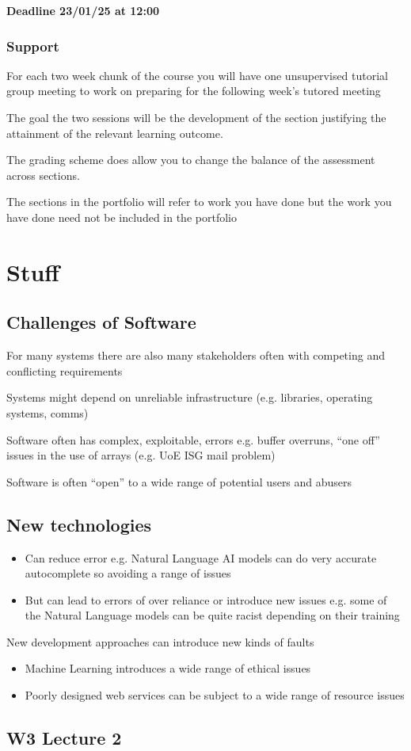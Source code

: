 \documentclass{article}
\begin{document}
\textbf{Deadline 23/01/25 at 12:00}

\subsubsection{Support}

For each two week chunk of the course you will have one unsupervised tutorial group meeting to work on preparing for the following week's tutored meeting

The goal the two sessions will be the development of the section justifying the attainment of the relevant learning outcome.

The grading scheme does allow you to change the balance of the assessment across sections.

The sections in the portfolio will refer to work you have done but the work you have done need not be included in the portfolio

\newpage
\section{Stuff}
\subsection{Challenges of Software}
For many systems there are also many stakeholders often with competing and conflicting requirements

Systems might depend on unreliable infrastructure (e.g. libraries, operating systems, comms)

Software often has complex, exploitable, errors e.g. buffer overruns, ``one off'' issues in the use of arrays (e.g. UoE ISG mail problem)

Software is often ``open'' to a wide range of potential users and abusers

\subsection{New technologies}
\begin{itemize}
    \item Can reduce error e.g. Natural Language AI models can do very accurate autocomplete so avoiding a range of issues
    \item But can lead to errors of over reliance or introduce new issues e.g. some of the Natural Language models can be quite racist depending on their training
\end{itemize}
New development approaches can introduce new kinds of faults
\begin{itemize}
    \item Machine Learning introduces a wide range of ethical issues
    \item Poorly designed web services can be subject to a wide range of resource issues
\end{itemize}

\newpage
\subsection{W3 Lecture 2}
\end{document}
